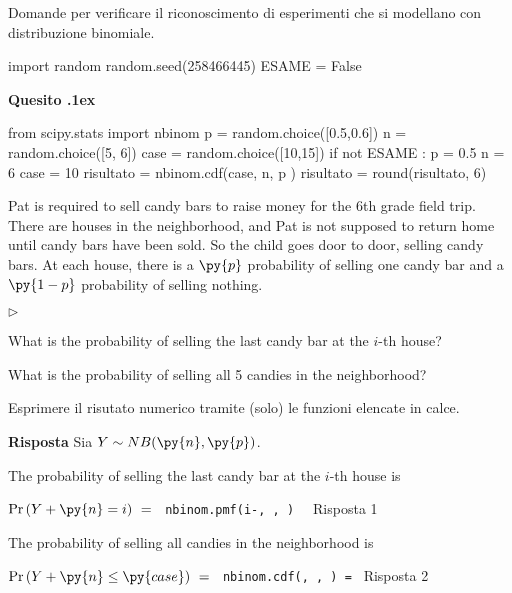 \documentclass[11pt,twoside,a4paper]{article}
\newcommand{\mylabel}[1]{#1\hfill}
\renewenvironment{itemize}
  {\begin{list}{$\triangleright$}{%
   \setlength{\parskip}{0mm}
   \setlength{\topsep}{.4\baselineskip}
   \setlength{\rightmargin}{0mm}
   \setlength{\listparindent}{0mm}
   \setlength{\itemindent}{0mm}
   \setlength{\labelwidth}{2ex}
   \setlength{\itemsep}{.4\baselineskip}
   \setlength{\parsep}{0mm}
   \setlength{\partopsep}{0mm}
   \setlength{\labelsep}{1ex}
   \setlength{\leftmargin}{\labelwidth+\labelsep}
   \let\makelabel\mylabel}}{%
   \end{list}\vspace*{-1.3mm}}
\def\Ex{{\rm E\,}}
\def\Var{{\rm Var\,}}
\newcounter{quesito}
\newenvironment{question}{\bigskip\addtocounter{quesito}{1}\bigskip\bigskip\par\textbf{Quesito \thequesito.\kern1ex}}{\vspace{\parskip}}
\newenvironment{answer}{\par\textbf{Risposta\quad}}{\vspace{\parskip}}
\begin{document}
\colorbox{blue!10}{\begin{minipage}{\textwidth}
Domande  per verificare il riconoscimento di esperimenti che si modellano con distribuzione binomiale.
\end{minipage}}

\bigskip\bigskip


\begin{pycode}
import random
random.seed(258466445)
ESAME = False
\end{pycode}




\begin{question}
\def\Pr{{\rm Pr\,}}
\def\Ex{{\rm E\,}}
\def\Var{{\rm Var\,}}
\begin{pycode}
from scipy.stats import nbinom
p = random.choice([0.5,0.6])
n = random.choice([5, 6])
case = random.choice([10,15])
if not ESAME :
   p = 0.5
   n = 6
   case = 10
risultato = nbinom.cdf(case, n, p )
risultato = round(risultato, 6)
\end{pycode}
Pat is required to sell candy bars to raise money for the 6th grade field trip. There are  houses in the neighborhood, and Pat is not supposed to return home until  candy bars have been sold. So the child goes door to door, selling candy bars. At each house, there is a $\py{p}$ probability of selling one candy bar and a $\py{1-p}$ probability of selling nothing.
\begin{itemize}
\item[1.] What is the probability of selling the last candy bar at the $i$-th house? 
\item[2.] What is the probability of selling all 5 candies in the neighborhood? 
\end{itemize}

Esprimere il risutato numerico tramite (solo) le funzioni elencate in calce. 
\begin{answer}
Sia $Y\sim NB(\py{n},\py{p})$.

The probability of selling the last candy bar at the $i$-th house is 

$\Pr(Y+\py{n}=i)\ =\ ${\tt{\color{blue}\ nbinom.pmf(i-, ,  ) } } {\color{blue}\hfill Risposta 1}

The probability of selling all  candies in the neighborhood is 

$\Pr(Y+\py{n}\le\py{case})\ =\ ${\tt{\color{blue}\ nbinom.cdf(, ,  ) }=  } {\color{blue}\hfill Risposta 2}\par
\end{answer}
\end{question}
\end{document}
